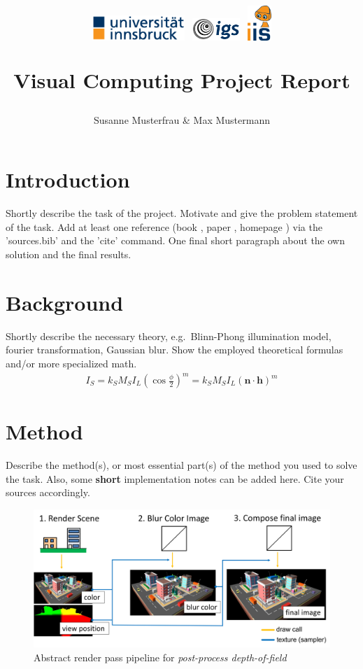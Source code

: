 \documentclass[11pt, a4paper, twocolumn]{article}
\title{
\begin{flushleft}
\includegraphics[width=3.5cm]{images/uibknew.eps}
\hfill
\includegraphics[width=1.8cm]{images/igslogo.png}
\hspace{0.3cm}
\includegraphics[width=0.9cm]{images/iislogo.png}
\end{flushleft}\vspace{0.5cm}
Visual Computing Project Report}
\author{Susanne Musterfrau \& Max Mustermann}
\begin{document}
\maketitle

\thispagestyle{empty}


\section*{Introduction}
Shortly describe the task of the project.
Motivate and give the problem statement of the task.
Add at least one reference (book \cite{Bridson08}, paper \cite{Zuenko20}, homepage \cite{lighthouse_timer}) via the 'sources.bib' and the 'cite' command.
One final short paragraph about the own solution and the final results.

\section*{Background}
Shortly describe the necessary theory, e.g.~Blinn-Phong illumination model, fourier transformation, Gaussian blur.
Show the employed theoretical formulas and/or more specialized math.
\begin{align}
    I_S = k_S M_S I_L \left( \cos \frac{\phi}{2} \right)^m = k_S M_S I_L \left( \mathbf{n} \cdot \mathbf{h} \right)^m
\end{align}

\section*{Method}
Describe the method(s), or most essential part(s) of the method you used to solve the task.
Also, some \textbf{short} implementation notes can be added here. Cite your sources accordingly.
%
\begin{figure}[!b]
 \includegraphics[width=1.0\columnwidth]{images/blur_pipeline.png}
 \centering
 \caption{Abstract render pass pipeline for \emph{post-process depth-of-field}}
 \label{fig:blur_pipeline}
\end{figure}
\end{document}
